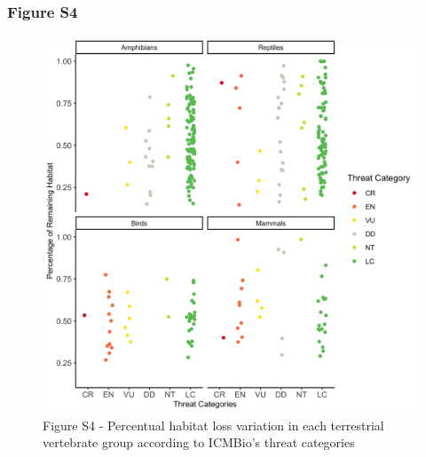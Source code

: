 \documentclass[12pt,openright,oneside,a4paper,english]{abntex2}
\begin{document}
\subsubsection*{Figure S4}\label{fig:fig1-s4}
\begin{figure}[H]
	\centering
	\includegraphics[width=160mm]{Fig c1-s4}
	\caption*{\small Figure S4 - Percentual habitat loss variation in each terrestrial vertebrate group according to ICMBio’s threat categories}
\end{figure}

\pagebreak
\end{document}
